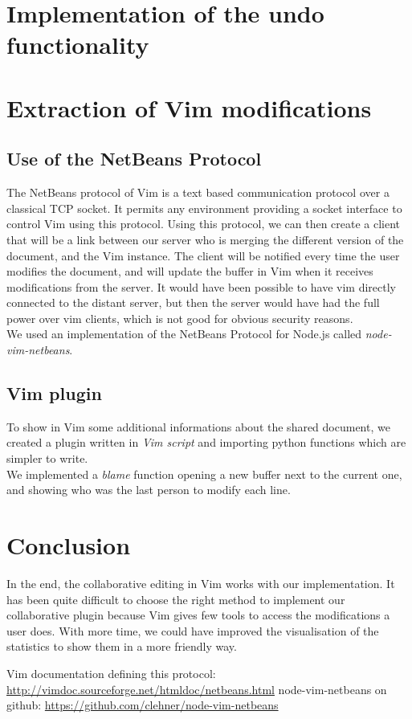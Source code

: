\documentclass{llncs}
\begin{document}
\section{Implementation of the undo functionality}\label{sec:Others}

\section{Extraction of Vim modifications}\label{sec:Others}

\subsection{Use of the NetBeans Protocol}

The NetBeans protocol of Vim is a text based communication protocol over a
classical TCP socket.
It permits any environment providing a socket interface to control Vim using
this protocol.\cite{netbeans} Using this protocol, we can then create a client
that will be a link between our server who is merging the different version of
the document, and the Vim instance.
The client will be notified every time the user modifies the document, and will
update the buffer in Vim when it receives modifications from the server.
It would have been possible to have vim directly connected to the distant
server, but then the server would have had the full power over vim clients,
which is not good for obvious security reasons.\\
We used an implementation of the NetBeans Protocol for Node.js called
\textit{node-vim-netbeans}.\cite{node-vim-netbeans}

\subsection{Vim plugin}

To show in Vim some additional informations about the shared document, we
created a plugin written in \textit{Vim script} and importing python functions
which are simpler to write.\\
We implemented a \textit{blame} function opening a new buffer next to the
current one, and showing who was the last person to modify each line.

\section{Conclusion}\label{sec:Conclusion}

In the end, the collaborative editing in Vim works with our implementation.
It has been quite difficult to choose the right method to implement our collaborative plugin
because Vim gives few tools to access the modifications a user does. With more time,
we could have improved the visualisation of the statistics to show them in a more friendly way.

\begin{thebibliography}{1}

Vim documentation defining this protocol: \url{http://vimdoc.sourceforge.net/htmldoc/netbeans.html}
node-vim-netbeans on github: \url{https://github.com/clehner/node-vim-netbeans}

\end{thebibliography}
\end{document}

